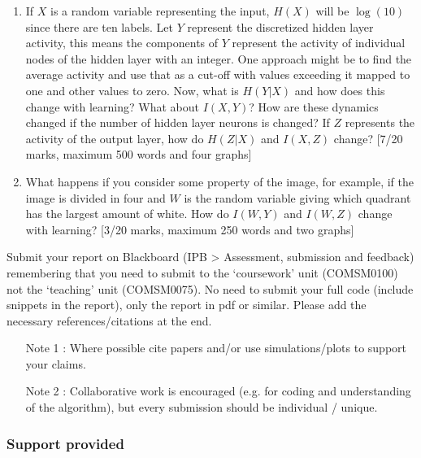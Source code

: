 \documentclass[12pt]{article}
\begin{document}
\begin{enumerate}
\begin{enumerate}
    \item If $X$ is a random variable representing the input, $H(X)$ will be
    $\log(10)$ since there are ten labels. Let $Y$ represent the
    discretized hidden layer activity, this means the components of $Y$
    represent the activity of individual nodes of the hidden layer
    with an integer. One approach might be to find the average
    activity and use that as a cut-off with values exceeding it mapped
    to one and other values to zero.  Now, what is $H(Y|X)$ and how does
    this change with learning? What about $I(X,Y)$? How are these
    dynamics changed if the number of hidden layer neurons is changed?
    If $Z$ represents the activity of the output layer, how do $H(Z|X)$
    and $I(X,Z)$ change? [7/20 marks, maximum 500 words and four graphs]

    \item What happens if you consider some property of the image, for
      example, if the image is divided in four and $W$ is the random
      variable giving which quadrant has the largest amount of
      white. How do $I(W,Y)$ and $I(W,Z)$ change with learning? [3/20
        marks, maximum 250 words and two graphs]

\end{enumerate}

\end{enumerate}
 

 

 Submit your report on Blackboard (IPB > Assessment, submission and
 feedback) remembering that you need to submit to the `coursework'
 unit (COMSM0100) not the `teaching' unit (COMSM0075). No need to
 submit your full code (include snippets in the report), only the
 report in pdf or similar. Please add the necessary
 references/citations at the end.

 
\begin{itemize}
\item[Note 1]: Where possible cite papers and/or use simulations/plots to support your claims. 
\item[Note 2]: Collaborative work is encouraged (e.g. for coding and understanding of the algorithm), but every submission should be individual / unique. 
\end{itemize}
 

\subsubsection*{Support provided}
\end{document}
